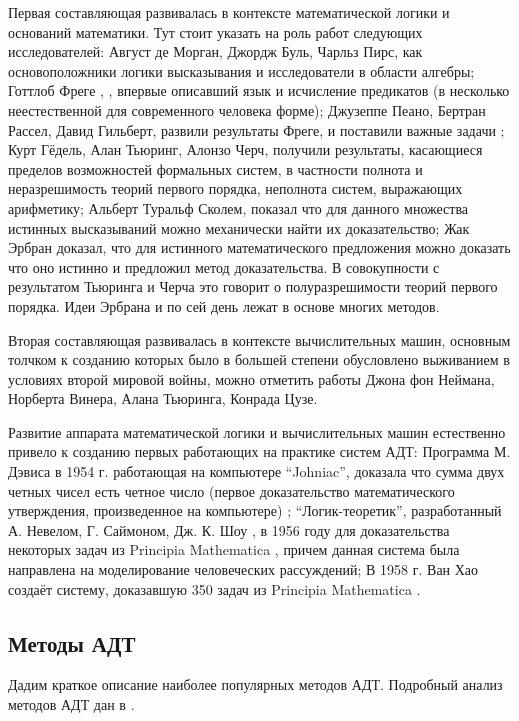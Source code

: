Первая составляющая развивалась в контексте математической логики и оснований математики. Тут стоит указать на роль работ следующих исследователей: Август де Морган, Джордж Буль, Чарльз Пирс, как основоположники логики высказывания и исследователи в области алгебры; Готтлоб Фреге \cite{Frege}, \cite{Sourcebook}, впервые описавший язык и исчисление предикатов (в несколько неестественной для современного человека форме); Джузеппе Пеано, Бертран Рассел, Давид Гильберт, развили результаты Фреге, и поставили важные задачи \cite{GilbertAkkerman}; Курт Гёдель, Алан Тьюринг, Алонзо Черч, получили результаты, касающиеся пределов возможностей формальных систем, в частности полнота \cite{Godel1} и неразрешимость теорий первого порядка, неполнота систем, выражающих арифметику; Альберт Туральф Сколем, показал что для данного множества истинных высказываний можно механически найти их доказательство; Жак Эрбран доказал, что для истинного математического предложения можно доказать что оно истинно и предложил метод доказательства. В совокупности с результатом Тьюринга и Черча это говорит о полуразрешимости теорий первого порядка. Идеи Эрбрана и по сей день лежат в основе многих методов.

Вторая составляющая развивалась в контексте вычислительных машин, основным толчком к созданию которых было в большей степени обусловлено выживанием в условиях второй мировой войны, можно отметить работы Джона фон Неймана, Норберта Винера, Алана Тьюринга, Конрада Цузе.

Развитие аппарата математической логики и вычислительных машин естественно привело к созданию первых работающих на практике систем АДТ: Программа М. Дэвиса в 1954 г. работающая на компьютере ``Johniac'', доказала что сумма двух четных чисел есть четное число (первое доказательство математического утверждения, произведенное на компьютере) \cite{LogicComp}; ``Логик-теоретик'', разработанный А. Невелом, Г. Саймоном, Дж. К. Шоу \cite{Newell1}, \cite{Newell2} в 1956 году для доказательства некоторых задач из Principia Mathematica \cite{PrinMat}, причем данная система была направлена на моделирование человеческих рассуждений; В 1958 г. Ван Хао создаёт систему, доказавшую 350 задач из Principia Mathematica \cite{WangHao}.


\subsection{Методы АДТ}
Дадим краткое описание наиболее популярных методов АДТ. Подробный анализ методов АДТ дан в \cite{HAR}.

